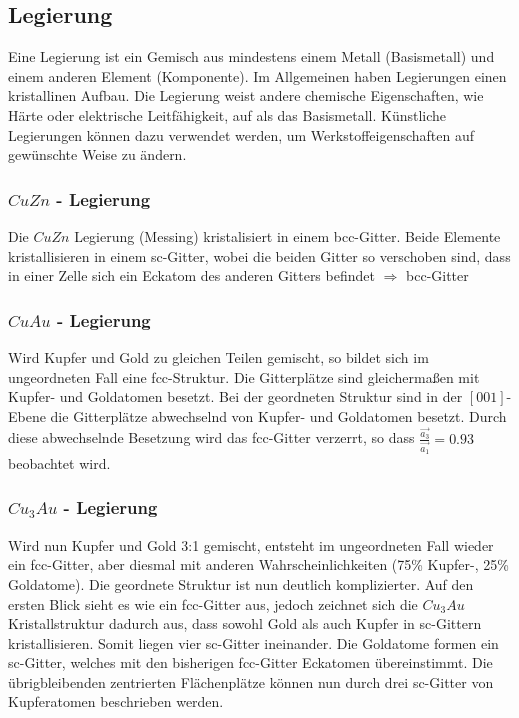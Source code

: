         \subsection{Legierung}
            Eine Legierung ist ein Gemisch aus mindestens einem Metall (Basismetall) und einem anderen Element (Komponente). Im Allgemeinen 
            haben Legierungen einen kristallinen Aufbau. Die Legierung weist andere chemische Eigenschaften, wie Härte oder elektrische Leitfähigkeit,
            auf als das Basismetall. Künstliche Legierungen können dazu verwendet werden, um Werkstoffeigenschaften auf gewünschte Weise zu ändern.
        \subsubsection{$CuZn$ - Legierung}
            Die $CuZn$ Legierung (Messing) kristalisiert in einem bcc-Gitter. Beide Elemente kristallisieren in einem sc-Gitter,
            wobei die beiden Gitter so verschoben sind, dass in einer Zelle sich ein Eckatom des anderen Gitters befindet $\Rightarrow$ bcc-Gitter 
            
        \subsubsection{$CuAu$ - Legierung}
            Wird Kupfer und Gold zu gleichen Teilen gemischt, so bildet sich im ungeordneten Fall eine fcc-Struktur. Die Gitterplätze sind gleichermaßen
            mit Kupfer- und Goldatomen besetzt. Bei der geordneten Struktur sind in der $[001]$-Ebene die Gitterplätze abwechselnd von Kupfer- und Goldatomen besetzt.
            Durch diese abwechselnde Besetzung wird das fcc-Gitter verzerrt, so dass $\frac{\vec{a_3}}{\vec{a_1}} = 0.93$ beobachtet wird.

        \subsubsection{$Cu_3Au$ - Legierung}
            Wird nun Kupfer und Gold 3:1 gemischt, entsteht im ungeordneten Fall wieder ein fcc-Gitter, aber diesmal mit anderen Wahrscheinlichkeiten
            (75\% Kupfer-, 25\% Goldatome). Die geordnete Struktur ist nun deutlich komplizierter. Auf den ersten Blick sieht es wie ein fcc-Gitter aus, 
            jedoch zeichnet sich die $Cu_3Au$ Kristallstruktur dadurch aus, dass sowohl Gold als auch Kupfer in sc-Gittern kristallisieren. Somit liegen 
            vier sc-Gitter ineinander. Die Goldatome formen ein sc-Gitter, welches mit den bisherigen fcc-Gitter Eckatomen übereinstimmt.
            Die übrigbleibenden zentrierten Flächenplätze können nun durch  drei sc-Gitter von Kupferatomen beschrieben werden.
